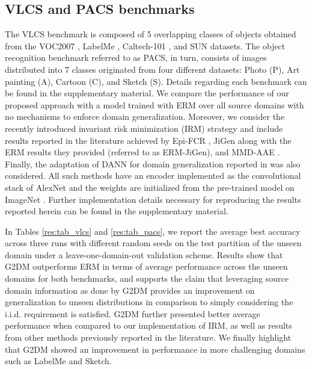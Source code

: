 \documentclass{article}
\begin{document}
\subsection{VLCS and PACS benchmarks}


The VLCS benchmark is composed of 5 overlapping classes of objects obtained from the VOC2007 \cite{everingham2010pascal}, LabelMe \cite{russell2008labelme}, Caltech-101 \cite{griffin2007caltech}, and SUN \cite{choi2010exploiting} datasets. The object recognition benchmark referred to as PACS, in turn, consists of images distributed into 7 classes originated from four different datasets: Photo (P), Art painting (A), Cartoon (C), and Sketch (S). Details regarding each benchmark can be found in the supplementary material. We compare the performance of our proposed approach with a model trained with ERM over all source domains with no mechanisms to enforce domain generalization. Moreover, we consider the recently introduced invariant risk minimization (IRM) strategy \cite{arjovsky2019invariant} and include results reported in the literature achieved by Epi-FCR \cite{li2019episodic}, JiGen \cite{carlucci2019domain} along with the ERM results they provided (referred to as ERM-JiGen), and MMD-AAE \cite{li2018domain}. Finally, the adaptation of DANN for domain generalization reported in \cite{li2019episodic} was also considered. All such methods have an encoder implemented as the convolutional stack of AlexNet \cite{krizhevsky2012imagenet} and the weights are initialized from the pre-trained model on ImageNet \cite{deng2009imagenet}. Further implementation details necessary for reproducing the results reported herein can be found in the supplementary material.


In Tables \ref{res:tab_vlcs} and \ref{res:tab_pacs}, we report the average best accuracy across three runs with different random seeds on the test partition of the unseen domain under a leave-one-domain-out validation scheme. Results show that G2DM outperforms ERM in terms of average performance across the unseen domains for both benchmarks, and supports the claim that leveraging source domain information as done by G2DM provides an improvement on generalization to unseen distributions in comparison to simply considering the i.i.d. requirement is satisfied. G2DM further presented better average performance when compared to our implementation of IRM, as well as results from other methods previously reported in the literature. We finally highlight that G2DM showed an improvement in performance in more challenging domains \cite{li2017deeper} such as LabelMe and Sketch. 
\end{document}
